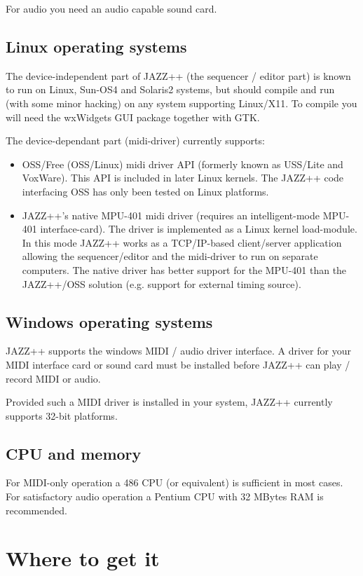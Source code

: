 \documentclass[letterpaper]{report}
\begin{document}
For audio you need an audio capable sound card.

\subsection{Linux operating systems}

The device-independent part of JAZZ++ (the sequencer / editor part) is known
to run on Linux, Sun-OS4 and Solaris2 systems, but should compile and run
(with some minor hacking) on any system supporting Linux/X11. To compile you
will need the wxWidgets GUI package together with GTK.

The device-dependant part (midi-driver) currently supports:
\begin{itemize}
\item OSS/Free (OSS/Linux) midi driver API (formerly known as USS/Lite and
VoxWare). This API is included in later Linux kernels. The JAZZ++ code
interfacing OSS has only been tested on Linux platforms.
\item JAZZ++'s native MPU-401 midi driver (requires an intelligent-mode MPU-401
interface-card). The driver is implemented as a Linux kernel
load-module. In this mode JAZZ++ works as a TCP/IP-based client/server
application allowing the sequencer/editor and the midi-driver to run on
separate computers. The native driver has better support for the MPU-401
than the JAZZ++/OSS solution (e.g. support for external timing source).
\end{itemize}

\subsection{Windows operating systems}

JAZZ++ supports the windows MIDI / audio driver interface. A driver for your
MIDI interface card or sound card must be installed before JAZZ++ can play /
record MIDI or audio.

Provided such a MIDI driver is installed in your system, JAZZ++ currently
supports 32-bit platforms.

\subsection{CPU and memory}
For MIDI-only operation a 486 CPU (or equivalent) is sufficient in most
cases.  For satisfactory audio operation a Pentium CPU with 32 MBytes
RAM is recommended.


\section{Where to get it}\label{wheretoget}
\end{document}
